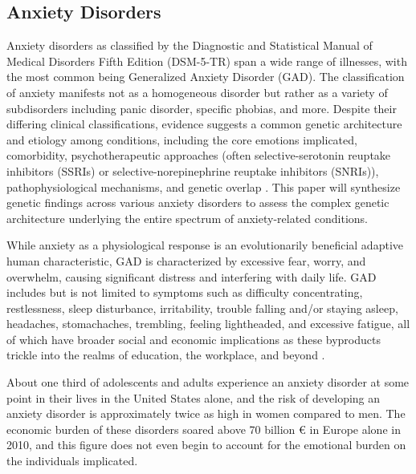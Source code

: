 \documentclass[12pt]{article}
\begin{document}
\subsection{Anxiety Disorders}
Anxiety disorders as classified by the Diagnostic and Statistical Manual of Medical Disorders Fifth Edition (DSM-5-TR) span a wide range of illnesses, with the most common being Generalized Anxiety Disorder (GAD). The classification of anxiety manifests not as a homogeneous disorder but rather as a variety of subdisorders including panic disorder, specific phobias, and more. Despite their differing clinical classifications, evidence suggests a common genetic architecture and etiology among conditions, including the core emotions implicated, comorbidity, psychotherapeutic approaches (often selective-serotonin reuptake inhibitors (SSRIs) or selective-norepinephrine reuptake inhibitors (SNRIs)), pathophysiological mechanisms, and genetic overlap \cite{Li2024}. This paper will synthesize genetic findings across various anxiety disorders to assess the complex genetic architecture underlying the entire spectrum of anxiety-related conditions. \par

While anxiety as a physiological response is an evolutionarily beneficial adaptive human characteristic, GAD is characterized by excessive fear, worry, and overwhelm, causing significant distress and interfering with daily life. GAD includes but is not limited to symptoms such as difficulty concentrating, restlessness, sleep disturbance, irritability, trouble falling and/or staying asleep, headaches, stomachaches, trembling, feeling lightheaded, and excessive fatigue, all of which have broader social and economic implications as these byproducts trickle into the realms of education, the workplace, and beyond \cite{NIMH2023}. \par

About one third of adolescents and adults experience an anxiety disorder at some point in their lives in the United States alone, and the risk of developing an anxiety disorder is approximately twice as high in women compared to men. \cite{NIMH2024} The economic burden of these disorders soared above 70 billion € in Europe alone in 2010, and this figure does not even begin to account for the emotional burden on the individuals implicated. \par
\end{document}
